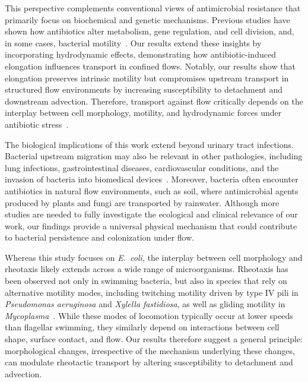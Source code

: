 \documentclass[twoside,twocolumn,9pt]{article}
\newcommand{\ecoli}{{\it E.~coli}}
\begin{document}
    This perspective complements conventional views of antimicrobial resistance that primarily focus on biochemical and genetic mechanisms. Previous studies have shown how antibiotics alter metabolism, gene regulation, and cell division, and, in some cases, bacterial motility~\cite{Kohanski2010-tt,Anjum2017-hu,Cylke2022-iy,Phan2018-gt}. Our results extend these insights by incorporating hydrodynamic effects, demonstrating how antibiotic-induced elongation influences transport in confined flows. Notably, our results show that elongation preserves intrinsic motility but compromises upstream transport in structured flow environments by increasing susceptibility to detachment and downstream advection. Therefore, transport against flow critically depends on the interplay between cell morphology, motility, and hydrodynamic forces under antibiotic stress~\cite{Mathijssen2019-zy,Tao2026-yc,Tokarova2021-wn}.
    
    The biological implications of this work extend beyond urinary tract infections. Bacterial upstream migration may also be relevant in other pathologies, including lung infections, gastrointestinal diseases, cardiovascular conditions, and the invasion of bacteria into biomedical devices~\cite{Siryaporn2015-mm,Tao2026-yc, Persat2015-rl,Secchi2020-ml,Shen2012-ji}.
    Moreover, bacteria often encounter antibiotics in natural flow environments, such as soil, where antimicrobial agents produced by plants and fungi are transported by rainwater.
    Although more studies are needed to fully investigate the ecological and clinical relevance of our work, our findings provide a universal physical mechanism that could contribute to bacterial persistence and colonization under flow.
    
    Whereas this study focuses on \ecoli, the interplay between cell morphology and rheotaxis likely extends across a wide range of microorganisms. Rheotaxis has been observed not only in swimming bacteria, but also in species that rely on alternative motility modes, including twitching motility driven by type IV pili in \textit{Pseudomonas aeruginosa} and \textit{Xylella fastidiosa}, as well as gliding motility in \textit{Mycoplasma}~\cite{Shen2012-ji,Meng2005-cf,Nakane2022-sm,Rosengarten1988-wh}. While these modes of locomotion typically occur at lower speeds than flagellar swimming, they similarly depend on interactions between cell shape, surface contact, and flow. Our results therefore suggest a general principle: morphological changes, irrespective of the mechanism underlying these changes, can modulate rheotactic transport by altering susceptibility to detachment and advection.
    
\end{document}
